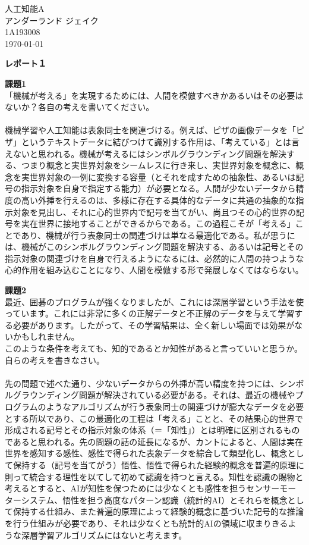 \documentclass[a4paper,11pt]{jsarticle}
\begin{document}
\hfill 人工知能A \\
\hfill アンダーランド ジェイク \\
\hfill 1A193008 \\
\hfill \today

\bigskip
\begin{center}\textbf{レポート１}\end{center} 

\noindent \textbf{課題1} \\
「機械が考える」を実現するためには、人間を模倣すべきかあるいはその必要はないか？各自の考えを書いてください。\\~\\
機械学習や人工知能は表象同士を関連づける。例えば、ピザの画像データを「ピザ」というテキストデータに結びつけて識別する作用は、「考えている」とは言えないと思われる。機械が考えるにはシンボルグラウンディング問題を解決する、つまり概念と実世界対象をシームレスに行き来し、実世界対象を概念に、概念を実世界対象の一例に変換する容量（とそれを成すための抽象性、あるいは記号の指示対象を自身で指定する能力）が必要となる。人間が少ないデータから精度の高い外挿を行えるのは、多様に存在する具体的なデータに共通の抽象的な指示対象を見出し、それに心的世界内で記号を当てがい、尚且つその心的世界の記号を実在世界に接地することができるからである。この過程こそが「考える」ことであり、機械が行う表象同士の関連づけは単なる最適化である。私が思うには、機械がこのシンボルグラウンディング問題を解決する、あるいは記号とその指示対象の関連づけを自身で行えるようになるには、必然的に人間の持つような心的作用を組み込むことになり、人間を模倣する形で発展しなくてはならない。

\bigskip

\noindent \textbf{課題2} \\
最近、囲碁のプログラムが強くなりましたが、これには深層学習という手法を使っています。これには非常に多くの正解データと不正解のデータを与えて学習する必要があります。したがって、その学習結果は、全く新しい場面では効果がないかもしれません。\\
このような条件を考えても、知的であるとか知性があると言っていいと思うか。自らの考えを書きなさい。\\~\\
先の問題で述べた通り、少ないデータからの外挿が高い精度を持つには、シンボルグラウンディング問題が解決されている必要がある。それは、最近の機械やプログラムのようなアルゴリズムが行う表象同士の関連づけが膨大なデータを必要とする所以であり、この最適化の工程は「考える」ことと、その結果心的世界で形成される記号とその指示対象の体系（＝「知性」）とは明確に区別されるものであると思われる。先の問題の話の延長になるが、カントによると、人間は実在世界を感知する感性、感性で得られた表象データを綜合して類型化し、概念として保持する（記号を当てがう）悟性、悟性で得られた経験的概念を普遍的原理に則って統合する理性を以てして初めて認識を持つと言える。知性を認識の賜物と考えるとすると、AIが知性を保つためには少なくとも感性を担うセンサーモーターシステム、悟性を担う高度なパターン認識（統計的AI）とそれらを概念として保持する仕組み、また普遍的原理によって経験的概念に基づいた記号的な推論を行う仕組みが必要であり、それは少なくとも統計的AIの領域に収まりきるような深層学習アルゴリズムにはないと考えます。

\bigskip
\end{document}
